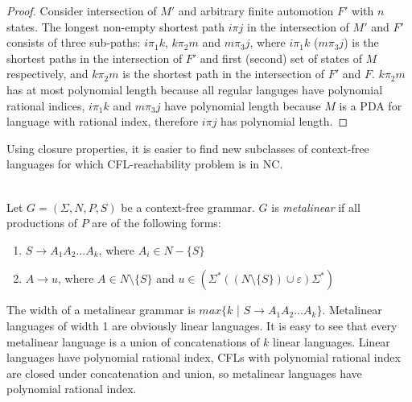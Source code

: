 \begin{proof}
Consider intersection of $M'$ and arbitrary finite automotion $F'$ with $n$ states. The longest non-empty shortest path $i \pi j$ in the intersection of $M'$ and $F'$ consists of three sub-paths: $i\pi_1k$, $k\pi_2m$ and $m\pi_3j$, where $i\pi_1k$ ($m\pi_3j$) is the shortest paths in the intersection of $F'$ and first (second) set of states of $M$ respectively, and $k\pi_2m$ is the shortest path in the intersection of $F'$ and $F$. $k\pi_2m$ has at most polynomial length because all regular languges have polynomial rational indices, $i\pi_1k$ and $m\pi_3j$ have polynomial length because $M$ is a PDA for language with rational index, therefore  $i \pi j$ has polynomial length.
\end{proof}


Using closure properties, it is easier to find new subclasses of context-free languages for which CFL-reachability problem is in NC.
\begin{example}
\\
Let $G = (\Sigma, N, P, S)$ be a context-free grammar. $G$ is \textit{metalinear} if all productions of $P$ are of the following forms:
\begin{enumerate}
\item $S \rightarrow A_1A_2...A_k$, where $A_i \in N - \{S\}$
\item $A \rightarrow u$, where $A \in N \setminus \{S\}$ and $u \in (\Sigma^*((N \setminus \{S\}) \cup {\varepsilon})\Sigma^*)$
\end{enumerate}


The width of a metalinear grammar is $max\{k$ | $S \rightarrow A_1A_2...A_k \}$. Metalinear languages of width 1 are obviously linear languages. It is easy to see that every metalinear language is a union of concatenations of $k$ linear languages. Linear languages have polynomial rational index,  CFLs with polynomial rational index are closed under concatenation and union, so metalinear languages have polynomial rational index.
\end{example}

